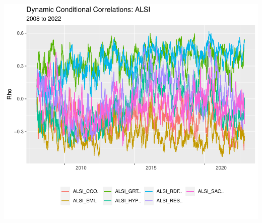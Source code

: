 \documentclass[11pt,preprint, authoryear]{elsarticle}
\let\origfigure\figure
\let\endorigfigure\endfigure
\renewenvironment{figure}[1][2] {
    \expandafter\origfigure\expandafter[H]
} {
    \endorigfigure
}
\numberwithin{equation}{section}
\numberwithin{figure}{section}
\numberwithin{table}{section}
\begin{document}
\begin{figure}
\centering
\includegraphics{Fin_Metrics_Project_files/figure-latex/unnamed-chunk-4-1.pdf}
\caption{Dynamic Conditional Correlations Graph}
\end{figure}
\end{document}
